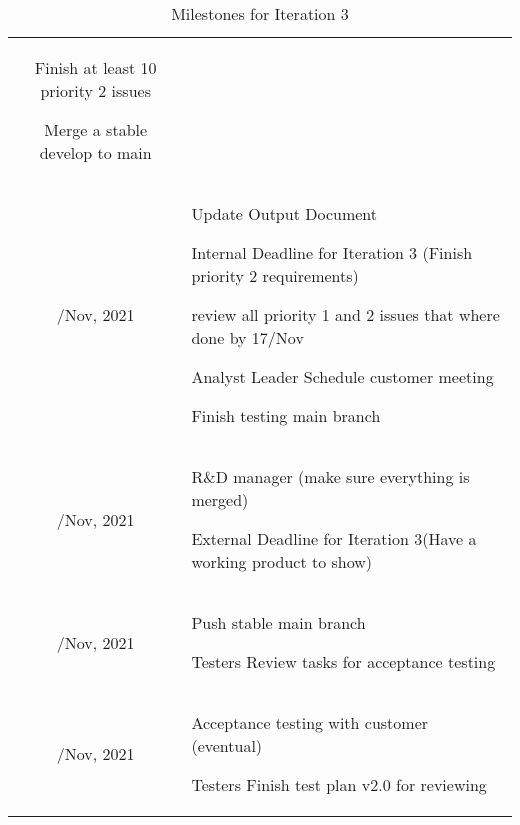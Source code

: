 \begin{table}[H]
\begin{tabular}{cp{9cm}}
    Finish at least 10 priority 2 issues

    Merge a stable develop to main \\
    \addlinespace
    18/Nov, 2021
    & Update Output Document 

    Internal Deadline for Iteration 3 (Finish priority 2 requirements)
    
    review all priority 1 and 2 issues that where done by 17/Nov

    Analyst Leader Schedule customer meeting

    Finish testing main branch \\
    \addlinespace
    21/Nov, 2021
    &  R\&D manager (make sure everything is merged)

    External Deadline for Iteration 3(Have a working product to show) \\
    \addlinespace
    22/Nov, 2021
    & Push stable main branch

    Testers Review tasks for acceptance testing \\
    \addlinespace
    23/Nov, 2021
    & Acceptance testing with customer (eventual)

    Testers Finish test plan v2.0 for reviewing \\
    \bottomrule
\end{tabular}
\caption{Milestones for Iteration 3}
\label{tab: Milestones iteration 3}
\end{table}


